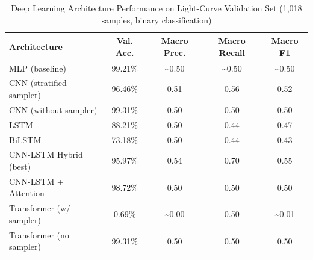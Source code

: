 \documentclass[preprint,11pt,times]{elsarticle}
\begin{document}
\begin{table}[H]
\centering
\small
\caption{Deep Learning Architecture Performance on Light-Curve Validation Set (1,018 samples, binary classification)}\label{tab6}
\begin{tabular}{p{3cm}cccc}
\toprule
Architecture & Val. Acc. & Macro Prec. & Macro Recall & Macro F1 \\
\midrule
MLP (baseline) & 99.21\% & \textasciitilde0.50 & \textasciitilde0.50 & \textasciitilde0.50 \\
CNN (stratified sampler) & 96.46\% & 0.51 & 0.56 & 0.52 \\
CNN (without sampler) & 99.31\% & 0.50 & 0.50 & 0.50 \\
LSTM & 88.21\% & 0.50 & 0.44 & 0.47\\
BiLSTM & 73.18\% & 0.50 & 0.44 & 0.43 \\
CNN-LSTM Hybrid (best) & 95.97\% & 0.54 & 0.70 & 0.55 \\
CNN-LSTM + Attention & 98.72\% & 0.50 & 0.50 & 0.50 \\
Transformer (w/ sampler) & 0.69\% & \textasciitilde0.00 & 0.50 & \textasciitilde0.01\\
Transformer (no sampler) & 99.31\% & 0.50 & 0.50 & 0.50 \\
\bottomrule
\end{tabular}
\end{table}
\end{document}
